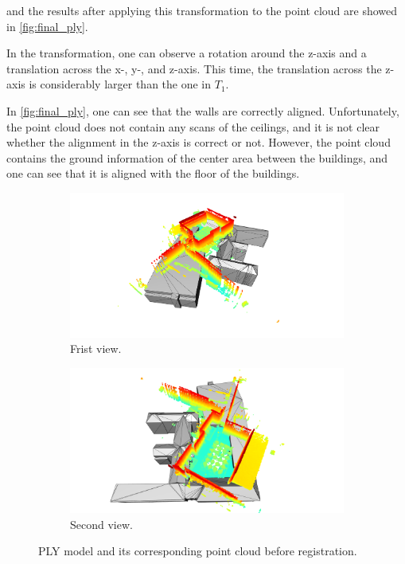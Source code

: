         and the results after applying this transformation to the point cloud are showed in \autoref{fig:final_ply}.        

        In the transformation, one can observe a rotation around the z-axis and a translation across the x-, y-, and z-axis.
        This time, the translation across the z-axis is considerably larger than the one in $T_1$.

        In \autoref{fig:final_ply}, one can see that the walls are correctly aligned.
        Unfortunately, the point cloud does not contain any scans of the ceilings, and it is not clear whether the alignment in the z-axis is correct or not. 
        However, the point cloud contains the ground information of the center area between the buildings, 
        and one can see that it is aligned with the floor of the buildings.
        
        
        \begin{figure}[H]
            \centering
            \begin{subfigure}{1\textwidth}
                \centering
                \includegraphics[scale=0.2]{images/solution_images/initial_ply_a.png}
                \caption{Frist view.}
                \label{fig:intial_ply_a}
            \end{subfigure}
            \hfill
            \begin{subfigure}{1\textwidth}
                \centering
                \includegraphics[scale=0.2]{images/solution_images/initial_ply_b.png}
                \caption{Second view.}
                \label{fig:intial_ply_b}
            \end{subfigure}
            \caption{PLY model and its corresponding point cloud before registration.}
            \label{fig:initial_ply}
        \end{figure}

